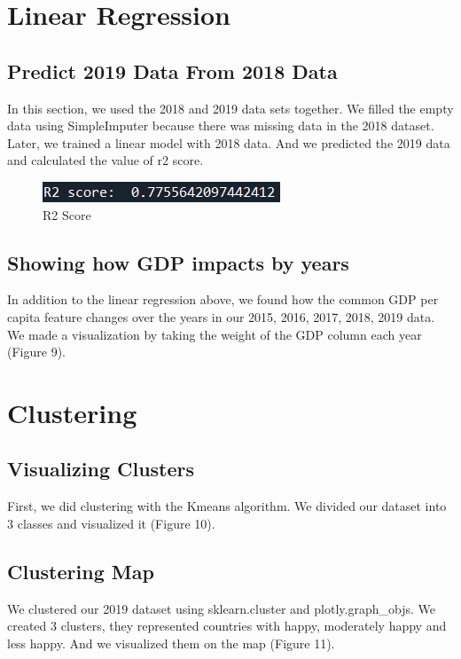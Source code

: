 \documentclass[onecolumn]{article}
\begin{document}
\section{Linear Regression}
\subsection{Predict 2019 Data From 2018 Data}
In this section, we used the 2018 and 2019 data sets together. We filled the empty data 
using 
SimpleImputer because there was missing data in the 2018 dataset. Later, we trained a linear
model with 2018 data. And we predicted the 2019 data and calculated the value of r2 score.
\begin{figure}[htp]
\centering
\includegraphics[scale=0.70]{r2.png}
\caption{R2 Score}
\end{figure}
\subsection{Showing how GDP impacts by years}
In addition to the linear regression above, we found how the common GDP per capita feature 
changes over the years in our 2015, 2016, 2017, 2018, 2019 data. We made a visualization by 
taking the weight of the GDP column each year (Figure 9).

\section{Clustering}
\subsection{Visualizing Clusters }
First, we did clustering with the Kmeans algorithm. We divided our dataset into 3 classes and visualized it (Figure 10).
\subsection{Clustering Map}
We clustered our 2019 dataset using sklearn.cluster and plotly.graph\_objs. We created 3 
clusters, they represented countries with happy, moderately happy and less happy. And we visualized
them on the map (Figure 11).
\end{document}
